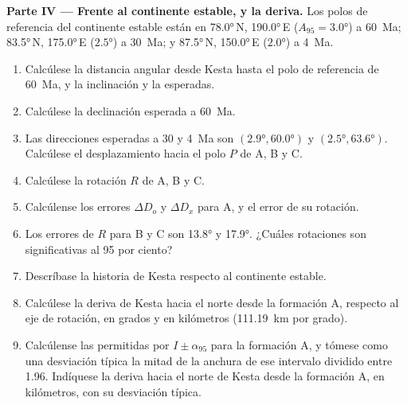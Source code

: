 \begin{problem}
\medskip\noindent\textbf{Parte IV --- Frente al continente estable, y la deriva.} Los
polos de referencia del continente estable están en \ang{78.0}\,N, \ang{190.0}\,E
($A_{95} = \ang{3.0}$) a \qty{60}{Ma}; \ang{83.5}\,N, \ang{175.0}\,E
($\ang{2.5}$) a \qty{30}{Ma}; y \ang{87.5}\,N, \ang{150.0}\,E ($\ang{2.0}$)
a \qty{4}{Ma}.
\begin{enumerate}[resume]
  \item Calcúlese la distancia angular desde Kesta hasta el polo de referencia
        de \qty{60}{Ma}, y la inclinación y la  esperadas.
  \item Calcúlese la declinación esperada a \qty{60}{Ma}.
  \item Las direcciones esperadas a 30 y \qty{4}{Ma} son $(\ang{2.9},
        \ang{60.0})$ y $(\ang{2.5}, \ang{63.6})$. Calcúlese el desplazamiento hacia el polo
        $P$ de A, B y C.
  \item Calcúlese la rotación $R$ de A, B y C.
  \item Calcúlense los errores $\Delta D_o$ y $\Delta D_x$ para A, y el error
        de su rotación.
  \item Los errores de $R$ para B y C son \ang{13.8} y \ang{17.9}. ¿Cuáles
        rotaciones son significativas al 95 por ciento?
  \item Descríbase la historia de Kesta respecto al continente estable.
  \item Calcúlese la deriva de Kesta hacia el norte desde la formación A, respecto al
        eje de rotación, en grados y en kilómetros
        (\qty{111.19}{km} por grado).
  \item Calcúlense las  permitidas por $I \pm \alpha_{95}$ para
        la formación A, y tómese como una desviación típica la mitad de la anchura de ese
        intervalo dividido entre 1.96. Indíquese la deriva hacia el norte de Kesta desde la formación
        A, en kilómetros, con su desviación típica.
\end{enumerate}
\end{problem}
